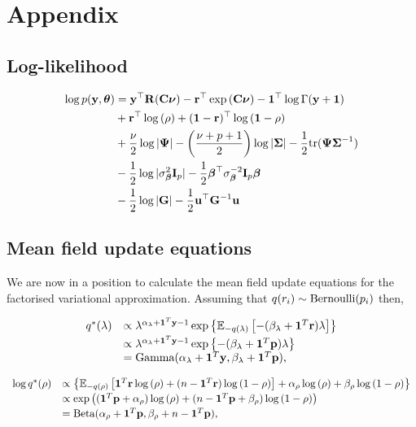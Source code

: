 \documentclass[11pt]{amsart}
\begin{document}
\section{Appendix} 

\subsection{Log-likelihood}
\begin{align*}
\log p({\bf y}, {\boldsymbol \theta}) &= {\bf y}^\top {\bf R}({\bf C} {\boldsymbol \nu}) - {\bf r}^\top \exp{({\bf C}{\boldsymbol\nu})} - {\bf 1}^\top \log \Gamma({\bf y} + {\bf 1}) \\
&+ {\bf r}^\top \log{(\rho)} + ({\bf 1} - {\bf r})^\top \log{({\bf1}- \rho)} \\
&+ \frac{\nu}{2} \log |{\boldsymbol \Psi}| - \left( \frac{\nu + p + 1}{2} \right) \log{|{\boldsymbol\Sigma}|} - \frac{1}{2} \text{tr} ({\boldsymbol \Psi} {\boldsymbol \Sigma}^{-1}) \\
&- \frac{1}{2} \log{|\sigma^2_{\boldsymbol\beta}{\bf I}_p|} - \frac{1}{2} {\boldsymbol \beta}^\top \sigma_{\boldsymbol \beta}^{-2} {\bf I}_p {\boldsymbol \beta} \\
&-\frac{1}{2} \log |{\bf G}| - \frac{1}{2} {\bf u}^\top {\bf G}^{-1} {\bf u}
\end{align*}

\subsection{Mean field update equations}
We are now in a position to calculate the mean field update equations for the factorised
variational approximation.
Assuming that $q(r_i) \sim \text{Bernoulli} (p_i)$ then,

$$
\begin{array}{rl}
	q^*(\lambda)
	  & \propto                                                            
	\lambda^{\alpha_\lambda+{\bf 1}^T{\bf y} - 1} 
	\exp\left\{ 
	{\mathbb E}_{-q(\lambda)} \left[
	-(\beta_\lambda + {\bf 1}^T{\bf r}) \lambda 
	\right] 
	\right\} 
	\\ [0.5ex]
	  &                                                                    
	\propto \lambda^{\alpha_\lambda+{\bf 1}^T{\bf y} - 1} \exp{\left \{-(\beta_\lambda + {\bf1}^T{\bf p})\lambda \right \} } 
	\\
	  & = \text{Gamma} (\alpha_\lambda+{\bf 1}^T{\bf y}, \beta_\lambda+{\bf 1}^T{\bf p}), 
\end{array}
$$

$$
\begin{array}{rl}
	\log{q^*(\rho)} 
	  &                                                                 
	\propto \left\{ 
	{\mathbb E}_{-q(\rho)}\left[ 
	{\bf 1}^T{\bf r} \log{(\rho)} 
	+ (n - {\bf 1}^T{\bf r}) \log{(1 - \rho)} 
	\right] 
	+ \alpha_\rho \log{(\rho)} 
	+ \beta_\rho \log{(1 - \rho)} 
	\right\} 
	\\ [0.5ex]
	  &                                                                 
	\propto \exp \left( 
	({\bf 1}^T{\bf p} + \alpha_\rho) \log{(\rho)} 
	+ (n - {\bf 1}^T{\bf p} + \beta_\rho) \log{(1 - \rho)} 
	\right) 
	\\ [0.5ex]
	  & = \text{Beta}(\alpha_\rho + {\bf 1}^T{\bf p}, \beta_\rho + n - {\bf 1}^T{\bf p}), 
\end{array}
$$
\end{document}
